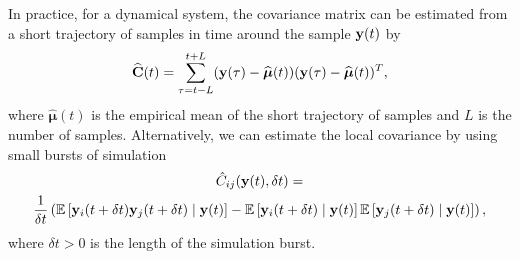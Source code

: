 
In practice, for a dynamical system, the covariance matrix can be estimated from a short trajectory of samples in time around the sample $\mathbf{y}(t)$ by
\begin{equation} \label{eq:cov1}
	\widehat{\mathbf{C}}(t) = \sum \limits _{\tau = t-L}^{t+L} (\mathbf{y}(\tau) - \widehat{\boldsymbol{\mu}}(t))(\mathbf{y}(\tau) - \widehat{\boldsymbol{\mu}}(t))^T,
\end{equation}
where $\widehat{\boldsymbol{\mu}}(t)$ is the empirical mean of the short trajectory of samples and $L$ is the number of samples.
%
Alternatively, we can estimate the local covariance by using small bursts of simulation 
\begin{multline} \label{eq:cov2}
\hat{C}_{ij}(\mathbf{y}(t), \delta t)
= \\
\frac{1}{ \delta t} \left( \mathbb{E} \left[ \mathbf{y}_i (t+\delta t) \mathbf{y}_j (t+ \delta t) \mid \mathbf{y}(t) \right]
- \mathbb{E} \left[ \mathbf{y}_i (t+\delta t) \mid \mathbf{y}(t) \right] \mathbb{E} \left[ \mathbf{y}_j (t+\delta t) \mid \mathbf{y}(t) \right] \right) ,
\end{multline}
%
where $\delta t > 0$ is the length of the simulation burst.
%

